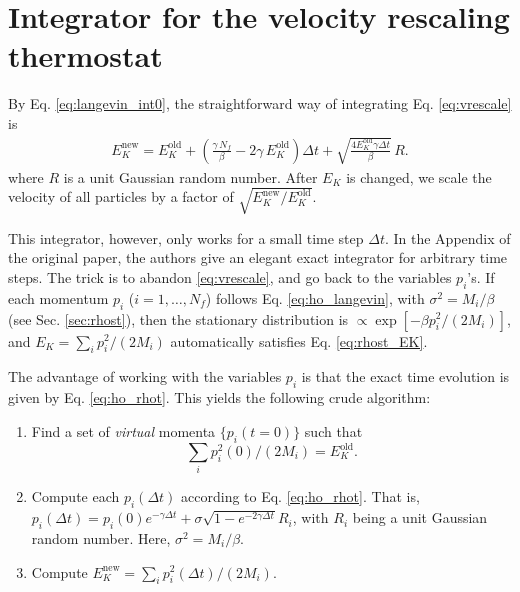 \documentclass[11pt]{article}
\begin{document}
\section{Integrator for the velocity rescaling thermostat}



By Eq. \eqref{eq:langevin_int0},
the straightforward way of integrating Eq. \eqref{eq:vrescale} is
\begin{align}
E_K^\mathrm{new}
=
E_K^\mathrm{old}
+ \left( \frac{ \gamma \, N_f }{ \beta } - 2 \gamma \, E_K^\mathrm{old} \right) \Delta t
+ \sqrt{ \frac{ 4 E_K^\mathrm{old} \gamma \Delta t} { \beta } } \, R.
\label{eq:vrescale_int0}
\end{align}
%
where $R$ is a unit Gaussian random number.
After $E_K$ is changed,
we scale the velocity of all particles by a factor of
$\sqrt{ E_K^\mathrm{new} / E_K^\mathrm{old} }$.


This integrator, however,
only works for a small time step $\Delta t$.
%
In the Appendix of the original paper\cite{bdp2007},
the authors give an elegant exact integrator
for arbitrary time steps.
%
The trick is
to abandon \eqref{eq:vrescale},
and go back to the variables $p_i$'s.
%
If each momentum $p_i$ ($i = 1, \dots, N_f$) follows Eq. \eqref{eq:ho_langevin},
with $\sigma^2 = M_i/\beta$ (see Sec. \ref{sec:rhost}),
then the stationary distribution is
$\propto \exp[-\beta p_i^2/(2 M_i)]$,
and $E_K = \sum_i p_i^2 /(2 M_i)$
automatically satisfies Eq. \eqref{eq:rhost_EK}.

The advantage of working with the variables $p_i$
is that the exact time evolution
is given by Eq. \eqref{eq:ho_rhot}.
%
This yields the following crude algorithm:
%
\begin{enumerate}
  \item
    Find a set of \emph{virtual} momenta $\{ p_i(t = 0) \}$ such that
    \begin{equation}
      \sum_i p_i^2(0)/(2 M_i) = E_K^\mathrm{old}.
      \label{eq:sumEKold}
    \end{equation}

  \item
    Compute each $p_i(\Delta t)$ according to Eq. \eqref{eq:ho_rhot}.
    That is,
    $p_i(\Delta t) = p_i(0) e^{-\gamma \Delta t}
    + \sigma \sqrt{1 - e^{-2\gamma \Delta t}} R_i$,
    with $R_i$ being a unit Gaussian random number.
    Here, $\sigma^2 = M_i/\beta$.

  \item
    Compute
    $E_K^\mathrm{new}
    =
    \sum_i p_i^2(\Delta t)/(2 M_i)$.
\end{enumerate}
\end{document}
